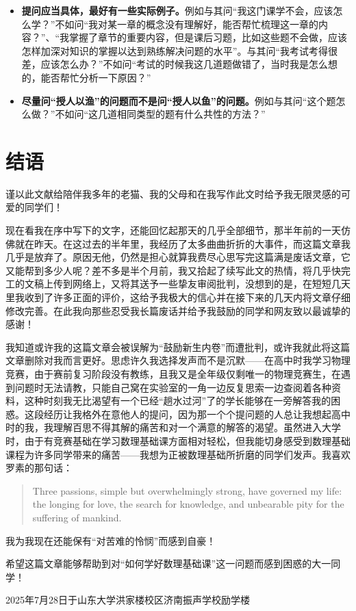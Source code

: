 \documentclass{ctexart}
\begin{document}
\begin{enumerate}[leftmargin=*, labelsep=0.5em]
\begin{itemize}
\item \textbf{提问应当具体，最好有一些实际例子。}例如与其问“我这门课学不会，应该怎么学？”不如问“我对某一章的概念没有理解好，能否帮忙梳理这一章的内容？”、“我掌握了章节的重要内容，但是课后习题，比如这些题不会做，应该怎样加深对知识的掌握以达到熟练解决问题的水平”。与其问“我考试考得很差，应该怎么办？”不如问“考试的时候我这几道题做错了，当时我是怎么想的，能否帮忙分析一下原因？”

\item \textbf{尽量问“授人以渔”的问题而不是问“授人以鱼”的问题。}例如与其问“这个题怎么做？”不如问“这几道相同类型的题有什么共性的方法？”
\end{itemize}
\end{enumerate}

\section{结语}
\begin{center}
  \kaishu 谨以此文献给陪伴我多年的老猫、我的父母和在我写作此文时给予我无限灵感的可爱的同学们！
\end{center}

现在看我在序中写下的文字，还能回忆起那天的几乎全部细节，那半年前的一天仿佛就在昨天。在这过去的半年里，我经历了太多曲曲折折的大事件，而这篇文章我几乎是放弃了。原因无他，仍然是担心就算我费尽心思写完这篇满是废话文章，它又能帮到多少人呢？差不多是半个月前，我又拾起了续写此文的热情，将几乎快完工的文稿上传到网络上，又将其送予一些挚友审阅批判，没想到的是，在短短几天里我收到了许多正面的评价，这给予我极大的信心并在接下来的几天内将文章仔细修改完善。在此我向那些忍受我长篇废话并给予我鼓励的同学和网友致以最诚挚的感谢！

我知道或许我的这篇文章会被误解为“鼓励新生内卷”而遭批判，或许我就此将这篇文章删除对我而言更好。思虑许久我选择发声而不是沉默——在高中时我学习物理竞赛，由于赛前复习阶段没有教练，且我又是全年级仅剩唯一的物理竞赛生，在遇到问题时无法请教，只能自己窝在实验室的一角一边反复思索一边查阅着各种资料，这种时刻我无比渴望有一个已经“趟水过河”了的学长能够在一旁解答我的困惑。这段经历让我格外在意他人的提问，因为那一个个提问题的人总让我想起高中时的我，我理解百思不得其解的痛苦和对一个满意的解答的渴望。虽然进入大学时，由于有竞赛基础在学习数理基础课方面相对轻松，但我能切身感受到数理基础课程为许多同学带来的痛苦——我想为正被数理基础所折磨的同学们发声。我喜欢罗素的那句话：
\begin{quotation}
  Three passions, simple but overwhelmingly strong, have governed my life: the longing for love, the search for knowledge, and unbearable pity for the suffering of mankind.
\end{quotation}
我为我现在还能保有“对苦难的怜悯”而感到自豪！

希望这篇文章能够帮助到对“如何学好数理基础课”这一问题而感到困惑的大一同学！

{\hfill 2025年7月28日\quad 于山东大学洪家楼校区\;济南振声学校\;励学楼}
\end{document}

